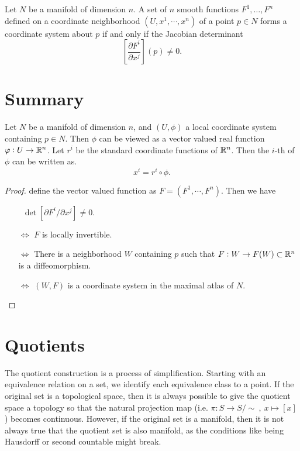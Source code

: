\begin{corollary}
	Let $ N $ be a manifold of dimension $ n $. A set of $ n $ smooth functions $ F^1,\dots,F^n $ defined on a coordinate neighborhood $ (U,x^1,\cdots,x^n) $ of a point $ p \in N $ forms a coordinate system about $ p $ if and only if the Jacobian determinant 
	\[ \left[  \frac{\partial F^i}{\partial x^j}  \right](p) \neq 0. \]
\end{corollary}

\section{Summary}
\begin{summary}
	Let $ N $ be a manifold of dimension $ n $, and $ (U,\phi) $ a local coordinate system containing $ p \in N $. Then $ \phi $ can be viewed as a vector valued real function $ \varphi:U \to \mathbb{R}^n $. Let $ r^i $ be the standard coordinate functions of $ \mathbb{R}^n $. Then the $ i\text{-th} $ of $ \phi $ can be written as.
	\[ x^i = r^i \circ \phi . \]
\end{summary}

\begin{proof}
	define the vector valued function as $ F = (F^1,\cdots,F^n) $. Then we have
	\begin{itemize}
		\item[$\,$] $ \det[\partial F^i/\partial x^j] \neq 0 $.
		\item[$\Longleftrightarrow$] $ F $ is locally invertible.
		\item[$\Longleftrightarrow$] There is a neighborhood $ W $ containing $ p $ such that $ F:W \to F(W) \subset \mathbb{R}^n $ is a diffeomorphism.
		\item[$\Longleftrightarrow$] $ (W,F) $ is a coordinate system in the maximal atlas of $ N $.
	\end{itemize}
\end{proof}




\section{Quotients}
The quotient construction is a process of simplification. Starting with an equivalence relation on a set, we identify each equivalence class to a point. If the original set is a topological space, then it is always possible to give the quotient space a topology so that the natural projection map (i.e. $ \pi: S\to S/\sim\ ,\ x\mapsto [x] $) becomes continuous. However, if the original set is a manifold, then it is not always true that the quotient set is also manifold, as the conditions like being Hausdorff or second countable might break.


